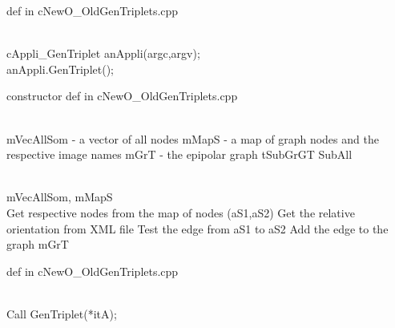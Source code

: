 \begin{algorithm}
\caption{ def in cNewO\_OldGenTriplets.cpp  }
\begin{algorithmic}
\State 
\\
\Comment {}
 \State cAppli\_GenTriplet anAppli(argc,argv);
\\
\State anAppli.GenTriplet();

\end{algorithmic}\label{alg:GenTriplMain}
\end{algorithm}


\begin{algorithm}
\caption{ constructor def in cNewO\_OldGenTriplets.cpp  }
\begin{algorithmic}
\State 
\\
\Comment {}
 \State mVecAllSom - a vector of all nodes
 \State mMapS - a map of graph nodes and the respective image names
 \State mGrT - the epipolar graph
 \State tSubGrGT SubAll 

 
\\
\Comment {}
\State mVecAllSom, mMapS
\\
\Comment {}
	\State Get respective nodes from the map of nodes (aS1,aS2)
	\State Get the relative orientation from XML file 
	\State Test the edge from aS1 to aS2  
	\State Add the edge to the graph mGrT

\EndFor 

\end{algorithmic}\label{alg:AppliGenTripl}
\end{algorithm}



\begin{algorithm}
\caption{ def in cNewO\_OldGenTriplets.cpp  }
\begin{algorithmic}
\State  
\\
\Comment {}
	 \State Call GenTriplet(*itA);

\EndFor 

\end{algorithmic}\label{alg:GenTripl}
\end{algorithm}

